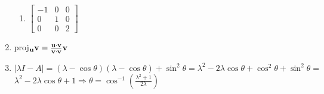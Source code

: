 \documentclass[12pt]{article}
\begin{document}
\begin{enumerate}
\begin{enumerate}
      \item $\begin{bmatrix} -1 &0&0\\ 0&1&0\\0&0&2\end{bmatrix}$

    \end{enumerate}

    \setcounter{enumi}{59}

  \item proj$_{\bold{u}}\bold{v}=\frac{\bold{u}\cdot\bold{v}}{\bold{v}\cdot\bold{v}}\bold{v}$

    \setcounter{enumi}{77}

  \item $|\lambda I-A|=(\lambda-\cos\theta)(\lambda-\cos\theta)+\sin^2\theta=\lambda^2-2\lambda\cos\theta+\cos^2\theta+\sin^2\theta=$\\$\lambda^2-2\lambda\cos\theta+1\Rightarrow \theta=\cos^{-1}\left( \frac{\lambda^2+1}{2\lambda} \right)$

\end{enumerate}
\end{document}
